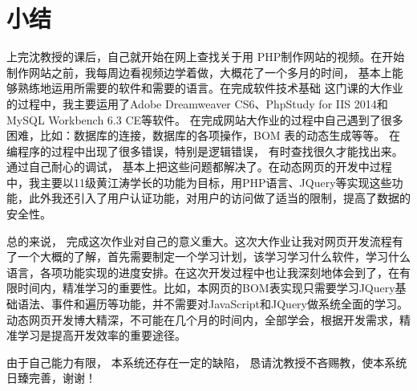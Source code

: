 \section*{小结}
上完沈教授的课后，自己就开始在网上查找关于用 PHP制作网站的视频。在开始制作网站之前，我每周边看视频边学着做，大概花了一个多月的时间， 基本上能够熟练地运用所需要的软件和需要的语言。在完成软件技术基础
这门课的大作业的过程中，我主要运用了Adobe Dreamweaver CS6、PhpStudy for IIS 2014和MySQL Workbench 6.3 CE等软件。
在完成网站大作业的过程中自己遇到了很多困难，比如：数据库的连接，数据库的各项操作，BOM 表的动态生成等等。 在编程序的过程中出现了很多错误，特别是逻辑错误， 有时查找很久才能找出来。 通过自己耐心的调试， 基本上把这些问题都解决了。在动态网页的开发中过程中，我主要以11级黄江涛学长的功能为目标，用PHP语言、JQuery等实现这些功能，此外我还引入了用户认证功能，对用户的访问做了适当的限制，提高了数据的安全性。

总的来说， 完成这次作业对自己的意义重大。这次大作业让我对网页开发流程有了一个大概的了解，首先需要制定一个学习计划，该学习学习什么软件，学习什么语言，各项功能实现的进度安排。在这次开发过程中也让我深刻地体会到了，在有限时间内，精准学习的重要性。比如，本网页的BOM表实现只需要学习JQuery基础语法、事件和遍历等功能，并不需要对JavaScript和JQuery做系统全面的学习。动态网页开发博大精深，不可能在几个月的时间内，全部学会，根据开发需求，精准学习是提高开发效率的重要途径。

由于自己能力有限， 本系统还存在一定的缺陷， 恳请沈教授不吝赐教，使本系统日臻完善，谢谢！